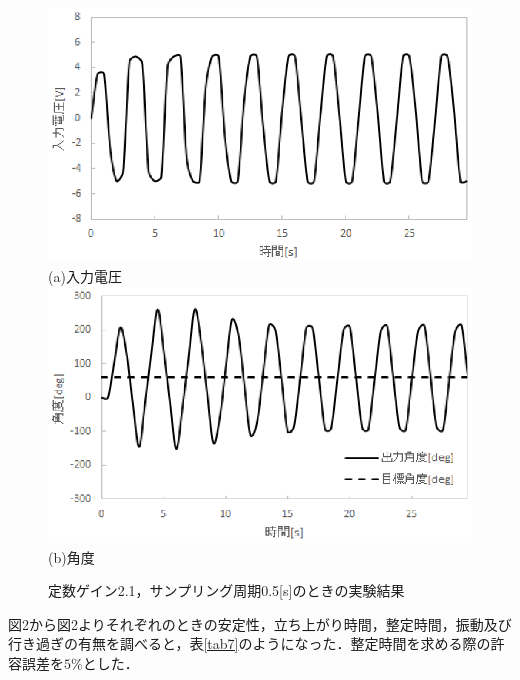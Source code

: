 \documentclass[11pt,a4paper]{jsarticle}
\begin{document}
\begin{figure}[H]
 \begin{center}
  \includegraphics[scale=.6]{./picture/regraph11.eps} \\
  (a)入力電圧 \\
  \includegraphics[scale=.6]{./picture/regraph12.eps} \\
  (b)角度
  \caption{定数ゲイン2.1，サンプリング周期0.5[s]のときの実験結果}
 \end{center}
\end{figure}


図2から図2よりそれぞれのときの安定性，立ち上がり時間，整定時間，振動及び行き過ぎの有無を調べると，表\ref{tab7}のようになった．整定時間を求める際の許容誤差を$5\%$とした．
\end{document}

